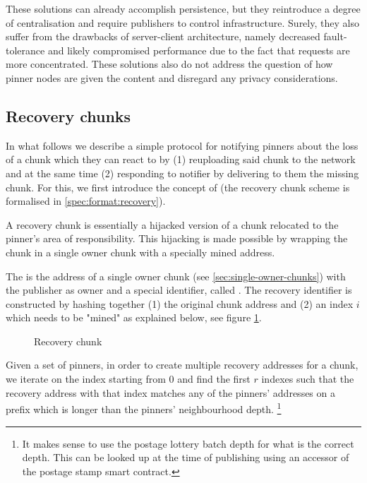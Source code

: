 These solutions can already accomplish persistence, but they reintroduce a degree of centralisation and require publishers to control infrastructure. Surely, they also suffer from the drawbacks of server-client architecture, namely decreased fault-tolerance and likely compromised performance due to the fact that requests are more concentrated. These solutions also do not address the question of how pinner nodes are given the content and disregard any privacy considerations.


\subsection{Recovery chunks}\label{sec:recovery-chunks}

In what follows we describe a simple protocol for notifying pinners about the loss of a chunk which they can react to by (1) reuploading said chunk to the network and at the same time (2) responding to notifier by delivering to them the missing chunk. For this, we first introduce the concept of  (the recovery chunk scheme is formalised in \ref{spec:format:recovery}).

A recovery chunk is essentially a hijacked version of a chunk relocated to the pinner's area of responsibility. This hijacking is made possible by wrapping the chunk in a single owner chunk with a specially mined address. 

The  is the address of a single owner chunk (see \ref{sec:single-owner-chunks}) with the publisher as owner and a special identifier, called . The recovery identifier is constructed by hashing together (1)  the original chunk address and (2) an index $i$ which needs to be "mined" as explained below, see figure \ref{fig:recovery-chunk}.

\begin{figure}[htbp]
  \centering
  \caption[Recovery chunk]{Recovery chunk}
  \label{fig:recovery-chunk}
\end{figure}


Given a set of pinners, in order to create multiple recovery addresses for a chunk, we iterate on the index starting from 0 and find the first $r$ indexes such that the recovery address with that index matches any of the pinners' addresses on a prefix which is longer than the pinners' neighbourhood depth.%
%
\footnote{It makes sense to use the postage lottery batch depth for what is the correct depth. This can be looked up at the time of publishing using an accessor of the postage stamp smart contract.}

